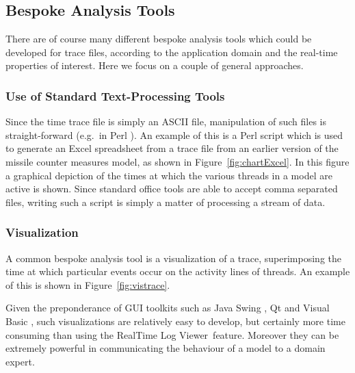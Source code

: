 \documentclass{overturerepchap}
\newcommand{\showtrace}{RealTime Log Viewer}
\begin{document}
\subsection{Bespoke Analysis Tools}

There are of course many different bespoke analysis tools which could
be developed for trace files, according to the application domain and
the real-time properties of interest.  Here we focus on a couple of
general approaches.

\subsubsection{Use of Standard Text-Processing Tools}

Since the time trace file is simply an ASCII file, manipulation of
such files is straight-forward (e.g.\ in Perl \cite{Wall&92}). An
example of this is a Perl script which is used to generate an Excel
spreadsheet from a trace file from an earlier version of the
missile counter measures model, as shown in
Figure~\ref{fig:chartExcel}. In this figure a graphical depiction of
the times at which the various threads in a model are active is
shown. Since standard office tools are able to accept comma separated
files, writing such a script is simply a matter of processing a stream
of data.

\subsubsection{Visualization}

A common bespoke analysis tool is a visualization of a trace,
superimposing the time at which particular events occur on the
activity lines of threads. An example of this is shown in
Figure~\ref{fig:vistrace}.

Given the preponderance of GUI toolkits such as Java Swing
\cite{JavaSwing}, Qt \cite{Qt} and Visual Basic \cite{VisualBasic},
such visualizations are relatively easy to develop, but certainly more
time consuming than using the \showtrace\ feature. Moreover they
can be extremely powerful in communicating the behaviour of a model to
a domain expert.
\end{document}

